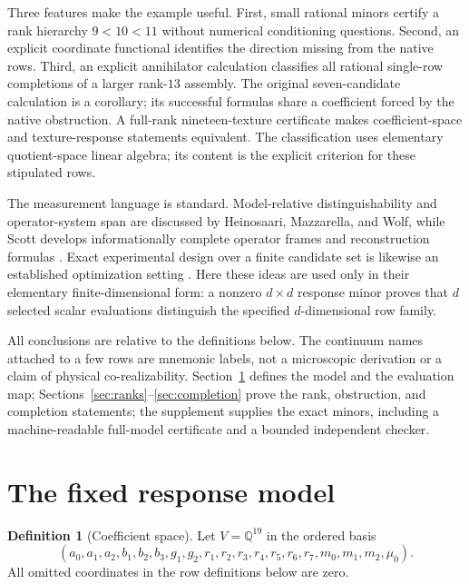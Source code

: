 \documentclass[12pt]{article}
\theoremstyle{definition}
\newtheorem{definition}[theorem]{Definition}
\theoremstyle{remark}
\newcommand{\QQ}{\mathbb Q}
\begin{document}
Three features make the example useful.  First, small rational minors certify
a rank hierarchy $9<10<11$ without numerical conditioning questions.  Second,
an explicit coordinate functional identifies the direction missing from the
native rows.  Third, an explicit annihilator calculation classifies all
rational single-row completions of a larger rank-$13$ assembly.  The original
seven-candidate calculation is a corollary; its successful formulas share a
coefficient forced by the native obstruction.  A full-rank nineteen-texture
certificate makes coefficient-space and texture-response statements
equivalent.  The classification uses elementary quotient-space linear algebra;
its content is the explicit criterion for these stipulated rows.

The measurement language is standard.  Model-relative distinguishability and
operator-system span are discussed by Heinosaari, Mazzarella, and Wolf, while
Scott develops informationally complete operator frames and reconstruction
formulas \cite{HeinosaariMazzarellaWolf2013,Scott2006}.  Exact experimental
design over a finite candidate set is likewise an established optimization
setting \cite{AhipasaogluCipollaGondzio2026}.  Here these ideas are used only
in their elementary finite-dimensional form: a nonzero $d\times d$ response
minor proves that $d$ selected scalar evaluations distinguish the specified
$d$-dimensional row family.

All conclusions are relative to the definitions below.  The continuum names
attached to a few rows are mnemonic labels, not a microscopic derivation or a
claim of physical co-realizability.  Section~\ref{sec:model} defines the model
and the evaluation map; Sections~\ref{sec:ranks}--\ref{sec:completion} prove
the rank, obstruction, and completion statements; the supplement supplies the
exact minors, including a machine-readable full-model certificate and a
bounded independent checker.

\section{The fixed response model}\label{sec:model}

\begin{definition}[Coefficient space]
Let $V=\QQ^{19}$ in the ordered basis
\[
(a_0,a_1,a_2,b_1,b_2,b_3,g_1,g_2,
 r_1,r_2,r_3,r_4,r_5,r_6,r_7,m_0,m_1,m_2,\mu_0).
\]
All omitted coordinates in the row definitions below are zero.
\end{definition}
\end{document}
